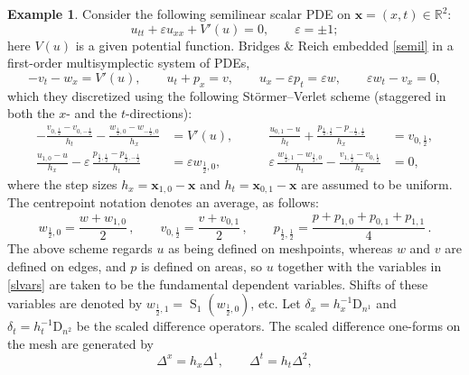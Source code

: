\documentclass[11pt]{article} %
\numberwithin{equation}{section}
\newcommand{\es}{\operatorname{S}}
\newcommand{\diff}[1]{\mathrm{D}_{n^{#1}}}
\newcommand{\mbx}{\mathbf{x}}
\theoremstyle{plain}
\theoremstyle{definition}
\newtheorem{exm}[defn]{Example}
\begin{document}
\begin{exm}\label{slbridges}
Consider the following semilinear scalar PDE on $\mbx=(x,t)\in\mathbb{R}^2$:
\begin{equation}\label{semil}
  u_{tt}+\varepsilon u_{xx}+V'(u)=0,\qquad\varepsilon=\pm1;
\end{equation}
here $V(u)$ is a given potential function. Bridges \& Reich \cite{BrRe2001} embedded \eqref{semil} in a first-order multisymplectic system of PDEs,
\begin{equation}
    -v_{t}-w_{x}=V'(u),\qquad u_{t}+p_{x}=v,\qquad
    u_{x}-\varepsilon p_{t}=\varepsilon w,\qquad\varepsilon
    w_{t}-v_{x}=0,
\end{equation}
which they discretized using the following St\"{o}rmer--Verlet scheme (staggered in both the $x$- and
the $t$-directions):
\begin{equation}\label{mi1}
  \begin{aligned}
    -\frac{v_{0,\frac12}-v_{0,-\frac12}}{h_t}-\frac{w_{\frac12,0}-w_{-\frac12,0}}{h_x}&=V'(u),\qquad&
    \frac{u_{0,1}-u}{h_t}+\frac{p_{\frac12,\frac12}-p_{-\frac12,\frac12}}{h_x}&=v_{0,\frac12},\\
    \frac{u_{1,0}-u}{h_x}-\varepsilon\,\frac{p_{\frac12,\frac12}-p_{\frac12,-\frac12}}{h_t}&=\varepsilon w_{\frac12,0},\qquad&
    \varepsilon\,\frac{w_{\frac12,1}-w_{\frac12,0}}{h_t}-\frac{v_{1,\frac12}-v_{0,\frac12}}{h_x}&=0,
  \end{aligned}
\end{equation}
where the step sizes $h_x=\mbx_{1,0}-\mbx$ and $h_t=\mbx_{0,1}-\mbx$ are assumed to be uniform. The centrepoint notation denotes an average, as follows: 
\begin{equation}\label{slvars}
w_{\frac12,0} = \frac{w+w_{1,0}}{2}\,, \qquad v_{0,\frac12} = \frac{v+v_{0,1}}{2}\,, \qquad p_{\frac12,\frac12}=\frac{p+p_{1,0}+p_{0,1}+p_{1,1}}{4}\,.
\end{equation}
The above scheme regards $u$ as being defined on meshpoints, whereas $w$ and $v$ are defined on edges, and $p$ is defined on areas, so $u$ together with the variables in \eqref{slvars} are taken to be the fundamental dependent variables. Shifts of these variables are denoted by $w_{\frac12,1}=\es_1\left(w_{\frac12,0}\right)$, etc. Let $\delta_x=h_x^{-1}\diff{1}$ and $\delta_t=h_t^{-1}\diff{2}$ be the scaled difference operators.
The scaled difference one-forms on the mesh are generated by
\begin{equation}
   \Delta^x=h_x\Delta^1,\qquad\Delta^t=h_t\Delta^2,
\end{equation}

\end{exm}
\end{document}
